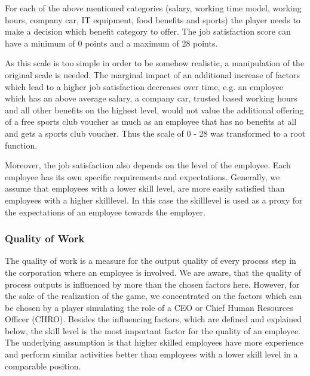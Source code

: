 For each of the above mentioned categories (salary, working time model, working hours, company car, IT equipment, food benefits and sports) the player needs to make a decision which benefit category to offer. The job satisfaction score can have a minimum of 0 points and a maximum of 28 points.

As this scale is too simple in order to be somehow realistic, a manipulation of the original scale is needed. The marginal impact of an additional increase of factors which lead to a higher job satisfaction decreases over time, e.g. an employee which has an above average salary, a company car, trusted based working hours and all other benefits on the highest level, would not value the additional offering of a free sports club voucher as much as an employee that has no benefits at all and gets a sports club voucher. Thus the scale of 0 - 28 was transformed to a root function.

Moreover, the job satisfaction also depends on the level of the employee. Each employee has its own specific requirements and expectations. Generally, we assume that employees with a lower skill level, are more easily satisfied than employees with a higher skilllevel. In this case the skilllevel  is used as a proxy for the expectations of an employee towards the employer. 


\subsubsection{Quality of Work}
The quality of work is a measure for the output quality of every process step in the corporation where an employee is involved. We are aware, that the quality of process outputs is influenced by more than the chosen factors here. However, for the sake of the realization of the game, we concentrated on the factors which can be chosen by a player simulating the role of a CEO or Chief Human Resources Officer (CHRO). Besides the influencing factors, which are defined and explained below, the skill level is the most important factor for the quality of an employee. The underlying assumption is that higher skilled employees have more experience and perform similar activities better than employees with a lower skill level in a comparable position.

